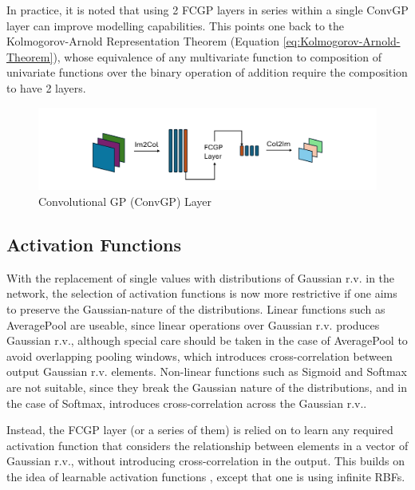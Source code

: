 \documentclass{article}
\begin{document}
In practice, it is noted that using 2 FCGP layers in series within a single ConvGP layer can improve modelling capabilities. This points one back to the Kolmogorov-Arnold Representation Theorem (Equation \ref{eq:Kolmogorov-Arnold-Theorem}), whose equivalence of any multivariate function to composition of univariate functions over the binary operation of addition require the composition to have 2 layers.

\begin{figure}[t]
    \centering
    \includegraphics[width=0.9\columnwidth]{Convolutional_GP.pdf} %
    \caption{Convolutional GP (ConvGP) Layer}
    \label{fig:Convolutional_GP}
\end{figure}

\subsection{Activation Functions}
With the replacement of single values with distributions of Gaussian r.v. in the network, the selection of activation functions is now more restrictive if one aims to preserve the Gaussian-nature of the distributions. Linear functions such as AveragePool \cite{poolingmethods} are useable, since linear operations over Gaussian r.v. produces Gaussian r.v., although special care should be taken in the case of AveragePool to avoid overlapping pooling windows, which introduces cross-correlation between output Gaussian r.v. elements. Non-linear functions such as Sigmoid and Softmax are not suitable, since they break the Gaussian nature of the distributions, and in the case of Softmax, introduces cross-correlation across the Gaussian r.v..

Instead, the FCGP layer (or a series of them) is relied on to learn any required activation function that considers the relationship between elements in a vector of Gaussian r.v., without introducing cross-correlation in the output. This builds on the idea of learnable activation functions \cite{learnableActivations}, except that one is using infinite RBFs.
\end{document}
